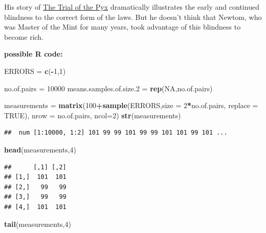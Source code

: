 \documentclass[
]{article}
\newenvironment{Shaded}{\begin{snugshade}}{\end{snugshade}}
\newcommand{\DataTypeTok}[1]{\textcolor[rgb]{0.13,0.29,0.53}{#1}}
\newcommand{\DecValTok}[1]{\textcolor[rgb]{0.00,0.00,0.81}{#1}}
\newcommand{\FloatTok}[1]{\textcolor[rgb]{0.00,0.00,0.81}{#1}}
\newcommand{\KeywordTok}[1]{\textcolor[rgb]{0.13,0.29,0.53}{\textbf{#1}}}
\newcommand{\NormalTok}[1]{#1}
\newcommand{\OperatorTok}[1]{\textcolor[rgb]{0.81,0.36,0.00}{\textbf{#1}}}
\newcommand{\OtherTok}[1]{\textcolor[rgb]{0.56,0.35,0.01}{#1}}
\newcommand{\StringTok}[1]{\textcolor[rgb]{0.31,0.60,0.02}{#1}}
\begin{document}
His story of \href{http://www.biostat.mcgill.ca/hanley/c323/pyx.pdf}{The
Trial of the Pyx} dramatically illustrates the early and continued
blindness to the correct form of the laws. But he doesn't think that
Newtom, who was Master of the Mint for many years, took advantage of
this blindness to become rich.

\textbf{possible R code:}

\begin{Shaded}
\begin{Highlighting}[]
\NormalTok{ERRORS =}\StringTok{ }\KeywordTok{c}\NormalTok{(}\OperatorTok{-}\DecValTok{1}\NormalTok{,}\DecValTok{1}\NormalTok{)}

\NormalTok{no.of.pairs =}\StringTok{ }\DecValTok{10000} 
\NormalTok{means.samples.of.size}\FloatTok{.2}\NormalTok{ =}\StringTok{ }\KeywordTok{rep}\NormalTok{(}\OtherTok{NA}\NormalTok{,no.of.pairs)}

\NormalTok{measurements =}\StringTok{ }\KeywordTok{matrix}\NormalTok{(}\DecValTok{100}\OperatorTok{+}\KeywordTok{sample}\NormalTok{(ERRORS,}\DataTypeTok{size =} \DecValTok{2}\OperatorTok{*}\NormalTok{no.of.pairs, }\DataTypeTok{replace =} \OtherTok{TRUE}\NormalTok{),}
                      \DataTypeTok{nrow =}\NormalTok{ no.of.pairs, }\DataTypeTok{ncol=}\DecValTok{2}\NormalTok{)}
\KeywordTok{str}\NormalTok{(measurements)}
\end{Highlighting}
\end{Shaded}

\begin{verbatim}
##  num [1:10000, 1:2] 101 99 99 101 99 99 101 101 99 101 ...
\end{verbatim}

\begin{Shaded}
\begin{Highlighting}[]
\KeywordTok{head}\NormalTok{(measurements,}\DecValTok{4}\NormalTok{)}
\end{Highlighting}
\end{Shaded}

\begin{verbatim}
##      [,1] [,2]
## [1,]  101  101
## [2,]   99   99
## [3,]   99   99
## [4,]  101  101
\end{verbatim}

\begin{Shaded}
\begin{Highlighting}[]
\KeywordTok{tail}\NormalTok{(measurements,}\DecValTok{4}\NormalTok{)}
\end{Highlighting}
\end{Shaded}
\end{document}
